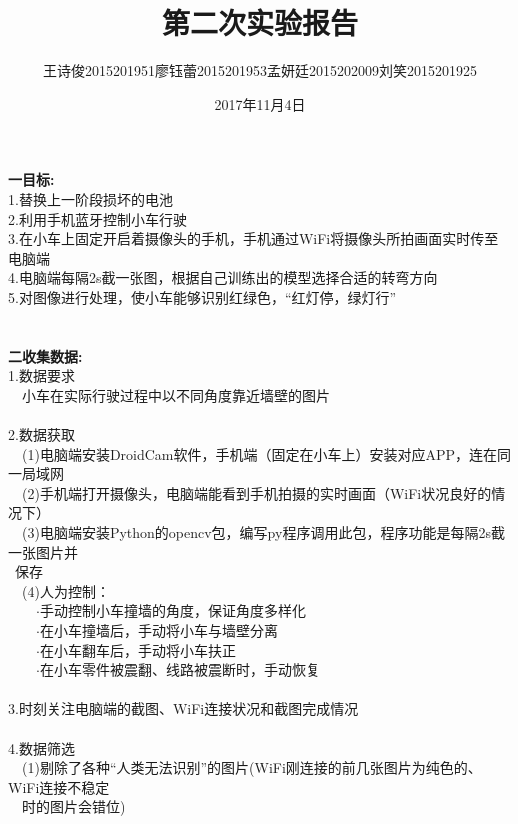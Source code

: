 \documentclass[19pt,a4paper]{article}
\title{第二次实验报告}
\author{王诗俊2015201951\quad 廖钰蕾2015201953\quad  孟妍廷2015202009\quad  刘笑2015201925}
\date{2017年11月4日}
\begin{document}
\maketitle

\textbf{一\quad 目标:}\\
\indent 1.替换上一阶段损坏的电池\\
\indent 2.利用手机蓝牙控制小车行驶\\
\indent 3.在小车上固定开启着摄像头的手机，手机通过WiFi将摄像头所拍画面实时传至电脑端\\
\indent 4.电脑端每隔2s截一张图，根据自己训练出的模型选择合适的转弯方向\\
\indent 5.对图像进行处理，使小车能够识别红绿色，“红灯停，绿灯行”\\
\\
\\
\indent\textbf{二\quad 收集数据:}\\ 
\indent 1.数据要求\\
\indent\ \ 小车在实际行驶过程中以不同角度靠近墙壁的图片\\
 \\
\indent 2.数据获取\\
\indent\ \ (1)电脑端安装DroidCam软件，手机端（固定在小车上）安装对应APP，连在同一局域网\\
\indent\ \ (2)手机端打开摄像头，电脑端能看到手机拍摄的实时画面（WiFi状况良好的情况下）\\
\indent\ \ (3)电脑端安装Python的opencv包，编写py程序调用此包，程序功能是每隔2s截一张图片并\\
\indent \ 保存\\
\indent\ \ (4)人为控制：\\
\indent\ \ \ \ $\cdot$手动控制小车撞墙的角度，保证角度多样化\\
\indent\ \ \ \ $\cdot$在小车撞墙后，手动将小车与墙壁分离\\
\indent\ \ \ \ $\cdot$在小车翻车后，手动将小车扶正\\
\indent\ \ \ \ $\cdot$在小车零件被震翻、线路被震断时，手动恢复\\
\\
\indent 3.时刻关注电脑端的截图、WiFi连接状况和截图完成情况\\
\\
\indent 4.数据筛选\\
\indent\ \ (1)剔除了各种“人类无法识别”的图片(WiFi刚连接的前几张图片为纯色的、WiFi连接不稳定\\
\indent\ \ 时的图片会错位)\\
\end{document}

